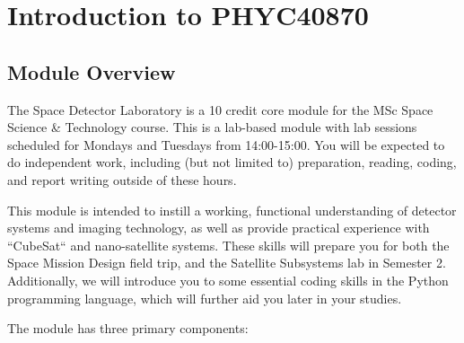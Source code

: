 \documentclass{tufte-book}
\newcommand{\doccls}[1]{\texttt{#1}}%
\begin{document}




%


\mainmatter


\chapter{Introduction to PHYC40870}
\section{Module Overview}
    
{The Space Detector Laboratory} is a 10 credit core module for the MSc Space Science \& Technology course. This is a lab-based module with lab sessions scheduled for Mondays and Tuesdays from 14:00-15:00. You will be expected to do independent work, including (but not limited to) preparation, reading, coding, and report writing outside of these hours. 

This module is intended to instill a working, functional understanding of detector systems and imaging technology, as well as provide practical experience with ``CubeSat`` and nano-satellite systems. These skills will prepare you for both the Space Mission Design field trip, and the Satellite Subsystems lab in Semester 2. Additionally, we will introduce you to some essential coding skills in the Python programming language, which will further aid you later in your studies.


The module has three primary components:
\end{document}
